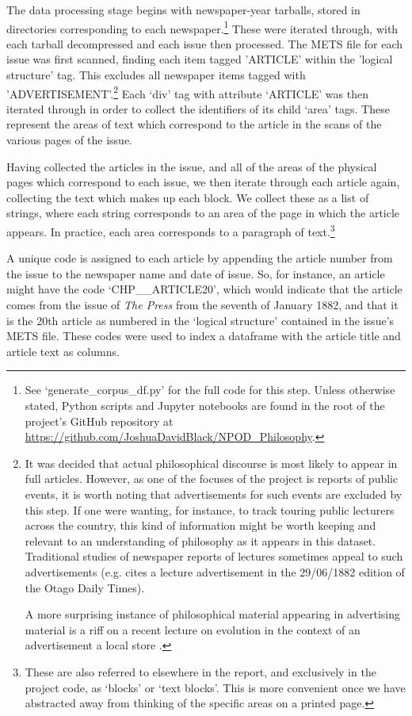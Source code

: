 \documentclass{article}
\begin{document}
The data processing stage begins with newspaper-year tarballs, stored in directories corresponding to each newspaper.\footnote{See `generate\_\-corpus\_\-df.py' for the full code for this step. Unless otherwise stated, Python scripts and Jupyter notebooks are found in the root of the project's GitHub repository at \url{https://github.com/JoshuaDavidBlack/NPOD_Philosophy}.} These were iterated through, with each tarball decompressed and each issue then processed. The METS file for each issue was first scanned, finding each item tagged 'ARTICLE' within the 'logical structure' tag. This excludes all newspaper items tagged with 'ADVERTISEMENT'.\footnote{It was decided that actual philosophical discourse is most likely to appear in full articles. However, as one of the focuses of the project is reports of public events, it is worth noting that advertisements for such events are excluded by this step. If one were wanting, for instance, to track touring public lecturers across the country, this kind of information might be worth keeping and relevant to an understanding of philosophy as it appears in this dataset. Traditional studies of newspaper reports of lectures sometimes appeal to such advertisements (e.g. \cite[fn. 13]{crane-2013} cites a lecture advertisement in the 29/06/1882 edition of the Otago Daily Times).

A more surprising instance of philosophical material appearing in advertising material is a riff on a recent lecture on evolution in the context of an advertisement a local store \cite[39--40]{crane-2013}.
}
Each `div' tag with attribute `ARTICLE' was then iterated through in order to collect the identifiers of its child `area' tags. These represent the areas of text which correspond to the article in the scans of the various pages of the issue. %

Having collected the articles in the issue, and all of the areas of the physical pages which correspond to each issue, we then iterate through each article again, collecting the text which makes up each block. We collect these as a list of strings, where each string corresponds to an area of the page in which the article appears. In practice, each area corresponds to a paragraph of text.\footnote{These are also referred to elsewhere in the report, and exclusively in the project code, as `blocks' or `text blocks'. This is more convenient once we have abstracted away from thinking of the specific areas on a printed page.}

A unique code is assigned to each article by appending the article number from the issue to the newspaper name and date of issue. So, for instance, an article might have the code `CHP\_\_\-ARTICLE20', which would indicate that the article comes from the issue of \textit{The Press} from the seventh of  January 1882, and that it is the 20th article as numbered in the `logical structure' contained in the issue's METS file. These codes were used to index a dataframe with the article title and article text as columns.
\end{document}
